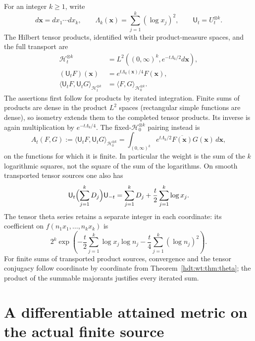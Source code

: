 \documentclass[11pt]{article}
\begin{document}
For an integer $k\geq1$, write
\[
 d\mathbf x=dx_1\cdots dx_k,\qquad
 \Lambda_k(\mathbf x)=\sum_{j=1}^k(\log x_j)^2,\qquad
 \mathsf U_t=U_t^{\otimes k}.
\]
The Hilbert tensor products, identified with their product-measure
spaces, and the full transport are
\begin{equation}\label{hdt:wt:eq:tensor}
 \begin{split}
 \mathcal H_t^{\otimes k}
 &=L^2((0,\infty)^k,e^{-t\Lambda_k/2}d\mathbf x),\\
 (\mathsf U_tF)(\mathbf x)&=e^{t\Lambda_k(\mathbf x)/4}F(\mathbf x),\\
 \langle\mathsf U_tF,\mathsf U_tG\rangle_{\mathcal H_t^{\otimes k}}
 &=\langle F,G\rangle_{\mathcal H_0^{\otimes k}}.
 \end{split}
\end{equation}
The assertions first follow for products by iterated integration.
Finite sums of products are dense in the product $L^2$ spaces
(rectangular simple functions are dense), so isometry extends
them to the completed tensor products.  Its inverse is again
multiplication by $e^{-t\Lambda_k/4}$.
The fixed-$\mathcal H_0^{\otimes k}$ pairing instead is
\begin{equation}\label{hdt:wt:eq:fixed-form}
 A_t(F,G):=\langle\mathsf U_tF,\mathsf U_tG\rangle_{\mathcal H_0^{\otimes k}}
 =\int_{(0,\infty)^k}e^{t\Lambda_k/2}\overline{F(\mathbf x)}
 G(\mathbf x)\,d\mathbf x,
\end{equation}
on the functions for which it is finite.  In particular the
weight is the sum of the $k$ logarithmic squares, not the square
of the sum of the logarithms.
On smooth transported tensor sources one also has
\[
 \mathsf U_t\Bigl(\sum_{j=1}^kD_j\Bigr)\mathsf U_{-t}
 =\sum_{j=1}^kD_j+\frac t2\sum_{j=1}^k\log x_j.
\]
The tensor theta series retains a separate integer in each
coordinate: its coefficient on $f(n_1x_1,\ldots,n_kx_k)$ is
\[
 2^k\exp\!\left(-\frac t2\sum_{j=1}^k\log x_j\log n_j
                 -\frac t4\sum_{j=1}^k(\log n_j)^2\right).
\]
For finite sums of transported product sources, convergence and
the tensor conjugacy follow coordinate by coordinate from
Theorem~\ref{hdt:wt:thm:theta}; the product of the summable majorants
justifies every iterated sum.

\section{A differentiable attained metric on the actual finite source}
\label{hdt:wt:sec:metric}
\end{document}
